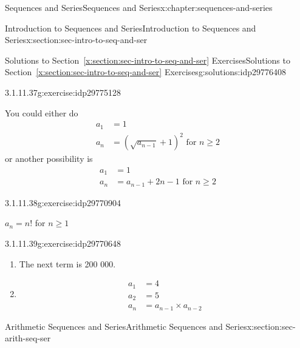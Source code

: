\documentclass[twoside,10pt,]{book}
\newcommand{\xreffont}{\relax}
\numberwithin{equation}{section}
\newcommand{\amp}{&}
\begin{document}
\begin{chapterptx}{Sequences and Series}{}{Sequences and Series}{}{}{x:chapter:sequences-and-series}
\begin{sectionptx}{Introduction to Sequences and Series}{}{Introduction to Sequences and Series}{}{}{x:section:sec-intro-to-seq-and-ser}
\begin{solutions-subsection}{Solutions to Section~{\xreffont\ref*{x:section:sec-intro-to-seq-and-ser}} Exercises}{}{Solutions to Section~{\xreffont\ref*{x:section:sec-intro-to-seq-and-ser}} Exercises}{}{}{g:solutions:idp29776408}
\begin{exercisegroup}
\end{exercisegroup}
\par\medskip\noindent
\begin{exercisegroup}
\begin{divisionsolutioneg}{3.1.11.37}{}{g:exercise:idp29775128}%
\par\smallskip%
\noindent\hypertarget{g:solution:idp29774360-main}{}You could either do%
\begin{align*}
a_1 \amp = 1\\
a_n \amp = \left( \sqrt{a_{n - 1}}  + 1 \right)^2 \text{   for } n \ge 2
\end{align*}
or another possibility is%
\begin{align*}
a_1 \amp = 1\\
a_n \amp = a_{n - 1} + 2n - 1 \text{   for } n \ge 2
\end{align*}
\end{divisionsolutioneg}%
\begin{divisionsolutioneg}{3.1.11.38}{}{g:exercise:idp29770904}%
\par\smallskip%
\noindent\hypertarget{g:solution:idp29772184-main}{}\({a_n} = n!\) for \(n \ge 1\)\end{divisionsolutioneg}%
\begin{divisionsolutioneg}{3.1.11.39}{}{g:exercise:idp29770648}%
\par\smallskip%
\noindent\hypertarget{g:solution:idp29773976-main}{}%
\begin{enumerate}[label=(\alph*)]
\item{}The next term is 200 000.%
\item{}%
\begin{align*}
a_1 \amp = 4\\
a_2 \amp = 5\\
a_n \amp = a_{n - 1} \times a_{n - 2}
\end{align*}
%
\end{enumerate}
\end{divisionsolutioneg}%
\end{exercisegroup}
\par\medskip\noindent
\end{solutions-subsection}
\end{sectionptx}
%
%
\typeout{************************************************}
\typeout{************************************************}
%
\begin{sectionptx}{Arithmetic Sequences and Series}{}{Arithmetic Sequences and Series}{}{}{x:section:sec-arith-seq-ser}

\end{sectionptx}
\end{chapterptx}
\end{document}
